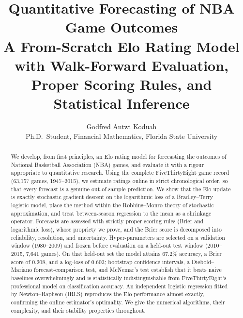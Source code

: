 \documentclass[11pt]{article}
\title{\textbf{Quantitative Forecasting of NBA Game Outcomes}\\[4pt]
\large A From-Scratch Elo Rating Model with Walk-Forward Evaluation,\\
Proper Scoring Rules, and Statistical Inference}
\author{Godfred Antwi Koduah\\
\small Ph.D.\ Student, Financial Mathematics, Florida State University}
\date{}
\begin{document}
\maketitle

\begin{abstract}
\noindent We develop, from first principles, an Elo rating model for forecasting
the outcomes of National Basketball Association (NBA) games, and evaluate it with
a rigour appropriate to quantitative research. Using the complete FiveThirtyEight
game record (63{,}157 games, 1947--2015), we estimate ratings online in strict
chronological order, so that every forecast is a genuine out-of-sample
prediction. We show that the Elo update is exactly stochastic gradient descent on
the logarithmic loss of a Bradley--Terry logistic model, place the method within
the Robbins--Monro theory of stochastic approximation, and treat between-season
regression to the mean as a shrinkage operator. Forecasts are assessed with
strictly proper scoring rules (Brier and logarithmic loss), whose propriety we
prove, and the Brier score is decomposed into reliability, resolution, and
uncertainty. Hyper-parameters are selected on a validation window
(1980--2009) and frozen before evaluation on a held-out test window
(2010--2015, 7{,}641 games). On that held-out set the model attains
$67.2\%$ accuracy, a Brier score of $0.208$, and a log-loss of $0.603$;
bootstrap confidence intervals, a Diebold--Mariano forecast-comparison test, and
McNemar's test establish that it beats naive baselines overwhelmingly and is
statistically indistinguishable from FiveThirtyEight's professional model on
classification accuracy. An independent logistic regression fitted by
Newton--Raphson (IRLS) reproduces the Elo performance almost exactly, confirming
the online estimator's optimality. We give the numerical algorithms, their
complexity, and their stability properties throughout.
\end{abstract}

\tableofcontents
\bigskip
\end{document}
